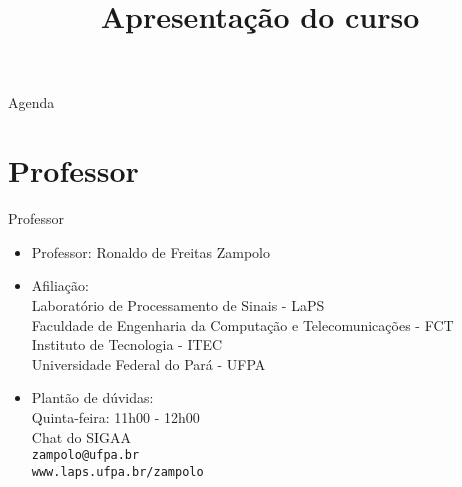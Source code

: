 


\title{\cursogrande\\ \vspace{1cm}Apresentação do curso}


   \maketitle[randomdots={false}]
   \begin{slide}{Agenda}
      \tableofcontents[content=sections]
   \end{slide}

   \section[ slide = true]{Professor }
      \begin{slide}[toc=]{Professor}
         \begin{itemize}
            \item Professor: Ronaldo de Freitas Zampolo
            \item Afiliação:\\
                  Laboratório de Processamento de Sinais - LaPS\\
                  Faculdade de Engenharia da Computação e Telecomunicações - FCT\\
                  Instituto de Tecnologia - ITEC\\
                  Universidade Federal do Pará - UFPA
            \item Plantão de dúvidas:\\
                  Quinta-feira: 11h00 - 12h00\\
                  Chat do SIGAA\\
                  \texttt{zampolo@ufpa.br}\\ 
                  \texttt{www.laps.ufpa.br/zampolo}
         \end{itemize}
      \end{slide}
      
